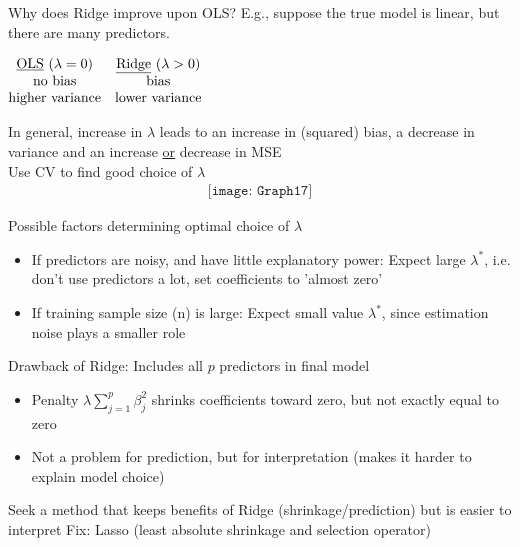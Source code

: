 \documentclass[11pt,a4paper,numbers=endperiod]{scrartcl}
\newcommand{\id}{\hspace*{4mm}}
\begin{document}
{Why does Ridge improve upon OLS? E.g., suppose the true model is linear, but there are many predictors.\\

\setlength\arraycolsep{25pt}
\begin{center}
	$\begin{matrix}
	\text{\underline{OLS} ($\lambda = 0$)} & \text{\underline{Ridge} ($\lambda > 0$)}\\
	\text{no bias} & \text{bias}\\
	\text{higher variance} & \text{lower variance}
	\end{matrix}$\\
\end{center}

In general, increase in $\lambda$ leads to an increase in (squared) bias, a decrease in variance and an increase \underline{or} decrease in MSE\\
\id {} Use CV to find good choice of $\lambda$
\begin{align*}
	\texttt{[image: Graph17]}
\end{align*}

Possible factors determining optimal choice of $\lambda$ \begin{itemize}
	\item If predictors are noisy, and have little explanatory power: Expect large $\lambda^*$, i.e. don't use predictors a lot, set coefficients to 'almost zero'
	\item If training sample size (n) is large: Expect small value $\lambda^*$, since estimation noise plays a smaller role
\end{itemize}

Drawback of Ridge: Includes all $p$ predictors in final model \begin{itemize}
	\item Penalty $\lambda \sum\limits_{j = 1}^p \beta_j^2$ shrinks coefficients toward zero, but not exactly equal to zero
	\item Not a problem for prediction, but for interpretation (makes it harder to explain model choice)
\end{itemize}

 Seek a method that keeps benefits of Ridge (shrinkage/prediction) but is easier to interpret
 Fix: Lasso (least absolute shrinkage and selection operator)\\

}
\end{document}
